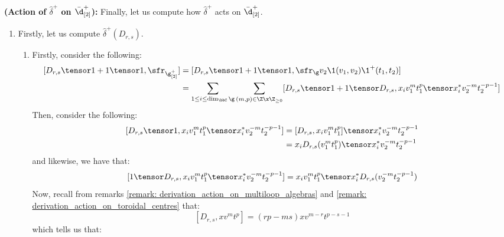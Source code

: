 \item \textbf{(Action of $\hat{\delta}^+$ on $\bar{\d}_{[2]}^+$):} Finally, let us compute how $\hat{\delta}^+$ acts on $\bar{\d}_{[2]}^+$. 
                    \begin{enumerate}
                        \item Firstly, let us compute $\hat{\delta}^+(D_{r, s})$. 
                        \begin{enumerate}
                            \item Firstly, consider the following:
                                $$
                                    \begin{aligned}
                                        [D_{r, s} \tensor 1 + 1 \tensor 1, \sfr_{\g_{[2]}^+}] & = [D_{r, s} \tensor 1 + 1 \tensor 1, \sfr_{\g} v_2 \1(v_1, v_2) \1^+(t_1, t_2)]
                                        \\
                                        & = \sum_{1 \leq i \leq \dim_{\bbC} \g} \sum_{(m, p) \in \Z \x \Z_{\geq 0}} [D_{r, s} \tensor 1 + 1 \tensor D_{r, s}, x_i v_1^m t_1^p \tensor x_i^* v_2^{-m} t_2^{-p - 1}]
                                    \end{aligned}
                                $$
                            Then, consider the following:
                                $$
                                    \begin{aligned}
                                        [D_{r, s} \tensor 1, x_i v_1^m t_1^p \tensor x_i^* v_2^{-m} t_2^{-p - 1}] & = [D_{r, s}, x_i v_1^m t_1^p] \tensor x_i^* v_2^{-m} t_2^{-p - 1}
                                        \\
                                        & = x_i D_{r, s}(v_1^m t_1^p) \tensor x_i^* v_2^{-m} t_2^{-p - 1}
                                    \end{aligned}
                                $$
                            and likewise, we have that:
                                $$[1 \tensor D_{r, s}, x_i v_1^m t_1^p \tensor x_i^* v_2^{-m} t_2^{-p - 1}] = x_i v_1^m t_1^p \tensor x_i^* D_{r, s}(v_2^{-m} t_2^{-p - 1})$$
                            Now, recall from remarks \ref{remark: derivation_action_on_multiloop_algebras} and \ref{remark: derivation_action_on_toroidal_centres} that:
                                $$[D_{r, s}, x v^m t^p] = (rp - ms) x v^{m - r} t^{p - s - 1}$$
                            which tells us that:
                                $$
                                    \begin{aligned}

\end{aligned}$$
\end{enumerate}
\end{enumerate}
